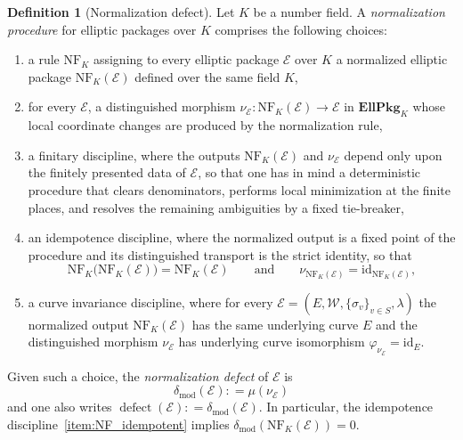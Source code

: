 \documentclass[10pt, reqno]{amsart}
\theoremstyle{plain}
\theoremstyle{definition}
\newtheorem{definition}[theorem]{Definition}
\theoremstyle{plain}
\newcommand{\coloneqq}{\mathrel{\mathop:}=}
\newcommand{\defect}{\delta_{\mathrm{mod}}}
\begin{document}
\begin{definition}[Normalization defect]\label{def:AccumulatedDefect}
Let $K$ be a number field. A \emph{normalization procedure} for elliptic packages over $K$ comprises the following choices:
\begin{enumerate}
\item[(i)]\label{item:NF_rule} a rule $\mathrm{NF}_K$ assigning to every elliptic package $\mathcal{E}$ over $K$ a normalized elliptic package $\mathrm{NF}_K(\mathcal{E})$ defined over the same field $K$,
\item[(ii)]\label{item:NF_transport} for every $\mathcal{E}$, a distinguished morphism $\nu_{\mathcal{E}} \colon \mathrm{NF}_K(\mathcal{E}) \to \mathcal{E}$ in $\mathbf{EllPkg}_K$ whose local coordinate changes are produced by the normalization rule,
\item[(iii)]\label{item:NF_finitary} a finitary discipline, where the outputs $\mathrm{NF}_K(\mathcal{E})$ and $\nu_{\mathcal{E}}$ depend only upon the finitely presented data of $\mathcal{E}$, so that one has in mind a deterministic procedure that clears denominators, performs local minimization at the finite places, and resolves the remaining ambiguities by a fixed tie-breaker,
\item[(iv)]\label{item:NF_idempotent} an idempotence discipline, where the normalized output is a fixed point of the procedure and its distinguished transport is the strict identity, so that
\[
  \mathrm{NF}_K\bigl(\mathrm{NF}_K(\mathcal{E})\bigr) = \mathrm{NF}_K(\mathcal{E})
  \qquad\text{and}\qquad
  \nu_{\mathrm{NF}_K(\mathcal{E})} = \mathrm{id}_{\mathrm{NF}_K(\mathcal{E})},
\]
\item[(v)]\label{item:NF_curve_invariance} a curve invariance discipline, where for every $\mathcal{E} = (E,\mathcal{W},\{\sigma_v\}_{v\in S},\lambda)$ the normalized output $\mathrm{NF}_K(\mathcal{E})$ has the same underlying curve $E$ and the distinguished morphism $\nu_{\mathcal{E}}$ has underlying curve isomorphism $\varphi_{\nu_{\mathcal{E}}} = \mathrm{id}_E$.
\end{enumerate}
Given such a choice, the \emph{normalization defect} of $\mathcal{E}$ is
\[
\delta_{\mathrm{mod}}(\mathcal{E}) \coloneqq \mu(\nu_{\mathcal{E}})
\]
and one also writes $\operatorname{defect}(\mathcal{E}) \coloneqq \delta_{\mathrm{mod}}(\mathcal{E})$. In particular, the idempotence discipline~\ref{item:NF_idempotent} implies $\defect(\mathrm{NF}_K(\mathcal{E})) = 0$.
\end{definition}
\end{document}
